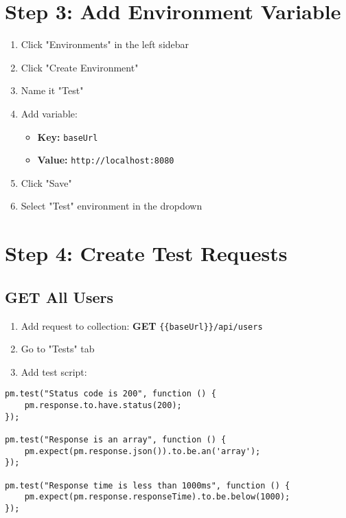 \documentclass[12pt,a4paper]{article}
\begin{document}
\section{Step 3: Add Environment Variable}

\begin{enumerate}
    \item Click "Environments" in the left sidebar
    \item Click "Create Environment"
    \item Name it "Test"
    \item Add variable:
    \begin{itemize}
        \item \textbf{Key:} \texttt{baseUrl}
        \item \textbf{Value:} \texttt{http://localhost:8080}
    \end{itemize}
    \item Click "Save"
    \item Select "Test" environment in the dropdown
\end{enumerate}

\section{Step 4: Create Test Requests}

\subsection{GET All Users}

\begin{enumerate}
    \item Add request to collection: \textbf{GET} \texttt{\{\{baseUrl\}\}/api/users}
    \item Go to "Tests" tab
    \item Add test script:
\end{enumerate}

\begin{lstlisting}[caption=Postman Test - GET All Users]
pm.test("Status code is 200", function () {
    pm.response.to.have.status(200);
});

pm.test("Response is an array", function () {
    pm.expect(pm.response.json()).to.be.an('array');
});

pm.test("Response time is less than 1000ms", function () {
    pm.expect(pm.response.responseTime).to.be.below(1000);
});
\end{lstlisting}
\end{document}

